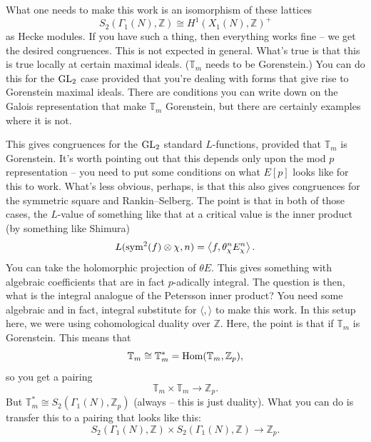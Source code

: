 \documentclass[reqno]{amsart} 
\begin{document}
What one needs to make this work is an isomorphism of these lattices
\begin{equation*}
  S_2(\Gamma_1(N), \mathbb{Z}) \cong H^1(X_1(N), \mathbb{Z})^+
\end{equation*}
as Hecke modules.  If you have such a thing, then everything works fine -- we get the desired congruences.  This is not expected in general.  What's true is that this is true locally at certain maximal ideals.  ($\mathbb{T}_m$ needs to be Gorenstein.)  You can do this for the $\operatorname{GL}_2$ case provided that you're dealing with forms that give rise to Gorenstein maximal ideals.  There are conditions you can write down on the Galois representation that make $\mathbb{T}_m$ Gorenstein, but there are certainly examples where it is not.

This gives congruences for the $\operatorname{GL}_2$ standard $L$-functions, provided that $\mathbb{T}_m$ is Gorenstein.  It's worth pointing out that this depends only upon the mod $p$ representation -- you need to put some conditions on what $E[p]$ looks like for this to work.  What's less obvious, perhaps, is that this also gives congruences for the symmetric square and Rankin--Selberg.  The point is that in both of those cases, the $L$-value of something like that at a critical value is the inner product (by something like Shimura)
\begin{equation*}
  L(\operatorname{sym}^2(f) \otimes \chi, n) = \left\langle f, \theta_\chi^n E_\chi^n  \right\rangle.
\end{equation*}
You can take the holomorphic projection of $\theta E$.  This gives something with algebraic coefficients that are in fact $p$-adically integral.  The question is then, what is the integral analogue of the Petersson inner product?  You need some algebraic and in fact, integral substitute for $\langle , \rangle$ to make this work.  In this setup here, we were using cohomological duality over $\mathbb{Z}$.  Here, the point is that if $\mathbb{T}_m$ is Gorenstein.  This means that
\begin{equation*}
  \mathbb{T}_m \cong \mathbb{T}_m^\ast = \operatorname{Hom}(\mathbb{T}_m, \mathbb{Z}_p),
\end{equation*}
so you get a pairing
\begin{equation*}
  \mathbb{T}_m \times \mathbb{T}_m \rightarrow \mathbb{Z}_p.
\end{equation*}
But $\mathbb{T}_m^\ast \cong S_2(\Gamma_1(N), \mathbb{Z}_p)$ (always -- this is just duality).  What you can do is transfer this to a pairing that looks like this:
\begin{equation*}
  S_2(\Gamma_1(N), \mathbb{Z}) \times S_2(\Gamma_1(N), \mathbb{Z}) \rightarrow \mathbb{Z}_p.
\end{equation*}
\end{document}
